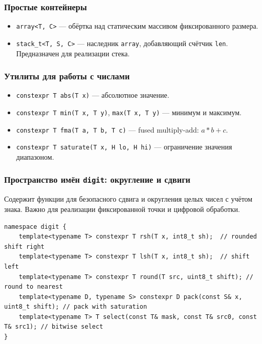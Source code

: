 \documentclass[a4paper,12pt]{article}
\begin{document}
\subsubsection{Простые контейнеры}

\begin{itemize}
    \item \texttt{array<T, C>} — обёртка над статическим массивом фиксированного размера.
    \item \texttt{stack\_t<T, S, C>} — наследник \texttt{array}, добавляющий счётчик \texttt{len}. Предназначен для реализации стека.
\end{itemize}

\subsubsection{Утилиты для работы с числами}

\begin{itemize}
    \item \texttt{constexpr T abs(T x)} — абсолютное значение.
    \item \texttt{constexpr T min(T x, T y)}, \texttt{max(T x, T y)} — минимум и максимум.
    \item \texttt{constexpr T fma(T a, T b, T c)} — fused multiply-add: $a*b + c$.
    \item \texttt{constexpr T saturate(T x, H lo, H hi)} — ограничение значения диапазоном.
\end{itemize}

\subsubsection{Пространство имён \texttt{digit}: округление и сдвиги}

Содержит функции для безопасного сдвига и округления целых чисел с учётом знака. Важно для реализации фиксированной точки и цифровой обработки.

\begin{lstlisting}[caption={digit namespace functions}]
namespace digit {
    template<typename T> constexpr T rsh(T x, int8_t sh);  // rounded shift right
    template<typename T> constexpr T lsh(T x, int8_t sh);  // shift left
    template<typename T> constexpr T round(T src, uint8_t shift); // round to nearest
    template<typename D, typename S> constexpr D pack(const S& x, uint8_t shift); // pack with saturation
    template<typename T> T select(const T& mask, const T& src0, const T& src1); // bitwise select
}
\end{lstlisting}
\end{document}
